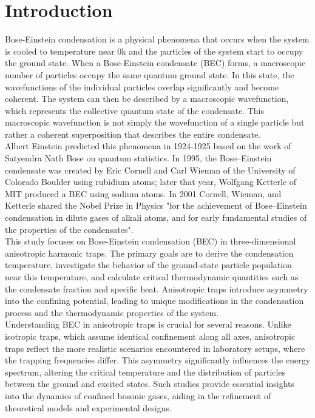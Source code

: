\documentclass{article}
\numberwithin{equation}{section}
\numberwithin{equation}{subsection}
\begin{document}
\section{Introduction}

Bose-Einstein condensation is a physical phenomena that occurs when the system is cooled to temperature near 0k and the particles of the system start to occupy the ground state.
 When a Bose-Einstein condensate (BEC) forms, a macroscopic number of particles occupy the same quantum ground state.
  In this state, the wavefunctions of the individual particles overlap significantly and become coherent.
   The system can then be described by a macroscopic wavefunction, which represents the collective quantum state of the condensate.
    This macroscopic wavefunction is not simply the wavefunction of a single particle but rather a coherent superposition that describes the entire condensate.\\

Albert Einstein predicted this phenomena in 1924-1925 based on the work of Satyendra Nath Bose on quantum statistics.
 In 1995, the Bose–Einstein condensate was created by Eric Cornell and Carl Wieman of the University of Colorado Boulder using rubidium atoms; later that year, Wolfgang Ketterle of MIT produced a BEC using sodium atoms.
  In 2001 Cornell, Wieman, and Ketterle shared the Nobel Prize in Physics "for the achievement of Bose–Einstein condensation in dilute gases of alkali atoms, and for early fundamental studies of the properties of the condensates".\\

  This study focuses on Bose-Einstein condensation (BEC) in three-dimensional anisotropic harmonic traps. The primary goals are to derive the condensation temperature, investigate the behavior of the ground-state particle population near this temperature, and calculate critical thermodynamic quantities such as the condensate fraction and specific heat. Anisotropic traps introduce asymmetry into the confining potential, leading to unique modifications in the condensation process and the thermodynamic properties of the system.\\

  Understanding BEC in anisotropic traps is crucial for several reasons. Unlike isotropic traps, which assume identical confinement along all axes, anisotropic traps reflect the more realistic scenarios encountered in laboratory setups, where the trapping frequencies differ. This asymmetry significantly influences the energy spectrum, altering the critical temperature and the distribution of particles between the ground and excited states. Such studies provide essential insights into the dynamics of confined bosonic gases, aiding in the refinement of theoretical models and experimental designs.\\
  
\end{document}
